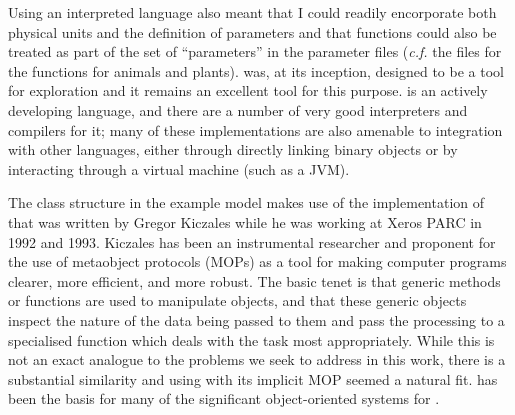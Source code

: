 Using an interpreted language also meant that I could readily
encorporate both physical units and the definition of parameters and
that functions could also be treated as part of the set of
``parameters'' in the parameter files (\emph{c.f.}  the files for the
 functions for animals and plants). \Scheme was,
at its inception, designed to be a tool for exploration
\cite{sussman1998first} and it remains an excellent tool for this
purpose. \Scheme is an actively developing language, and there are a
number of very good interpreters and compilers for it; many of these
implementations are also amenable to integration with other languages,
either through directly linking binary objects or by interacting
through a virtual machine (such as a JVM).

The class structure in the example model makes use of the \Scheme
implementation of \SCLOS that was written
by Gregor Kiczales \cite{kiczales1993xerox} while he was working at
Xeros PARC in 1992 and 1993.  Kiczales has been an instrumental
researcher and proponent for the use of metaobject protocols (MOPs) as
a tool for making computer programs clearer, more efficient, and more
robust.  The basic tenet is that generic methods or functions are used
to manipulate objects, and that these generic objects inspect the
nature of the data being passed to them and pass the processing to a
specialised function which deals with the task most appropriately.
While this is not an exact analogue to the problems we seek to address
in this work, there is a substantial similarity and using \SCLOS
with its implicit MOP seemed a natural fit.  \SCLOS has been
the basis for many of the significant object-oriented  systems for
\Scheme.


